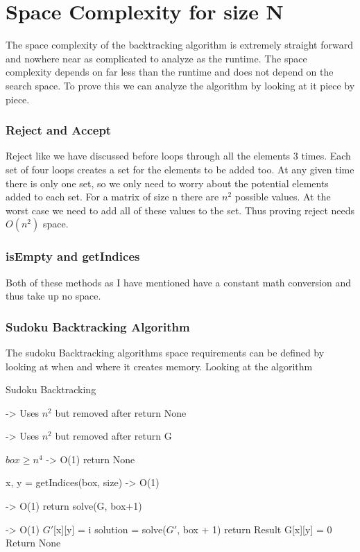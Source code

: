 \documentclass{sig-alternate}
\begin{document}
\section{Space Complexity for size N}
The space complexity of the backtracking algorithm is extremely straight forward and nowhere near as complicated to analyze as the runtime. The space complexity depends on far less than the runtime and does not depend on the search space. To prove this we can analyze the algorithm by looking at it piece by piece. 

\subsubsection{Reject and Accept}
Reject like we have discussed before loops through all the elements 3 times. Each set of four loops creates a set for the elements to be added too. At any given time there is only one set, so we only need to worry about the potential elements added to each set. For a matrix of size n there are $n^2$ possible values. At the worst case we need to add all of these values to the set. Thus proving reject needs $O(n^2)$ space. 

\subsubsection{isEmpty and getIndices}
Both of these methods as I have mentioned have a constant math conversion and thus take up no space. 

\subsubsection{Sudoku Backtracking Algorithm}
The sudoku Backtracking algorithms space requirements can be defined by looking at when and where it creates memory. Looking at the algorithm 

\begin{algorithm}
\caption{Sudoku Backtracking}\label{solve}
\begin{algorithmic}[1]

 -> Uses $n^2$ but removed after
\State return None
\EndIf

 -> Uses $n^2$ but removed after
\State return G
\EndIf

\If $box \ge n^4$  -> O(1)
\State return None
\EndIf

\State x, y = getIndices(box, size) -> O(1)

  -> O(1)
\State return solve(G, box+1) 
\EndIf

 -> O(1)
\State $G'$[x][y] = i
\State solution = solve($G'$, box + 1)
\State return Result
\EndIf
\EndFor
\State G[x][y] = 0
\State Return None
\EndProcedure
\end{algorithmic}
\end{algorithm}
\end{document}

